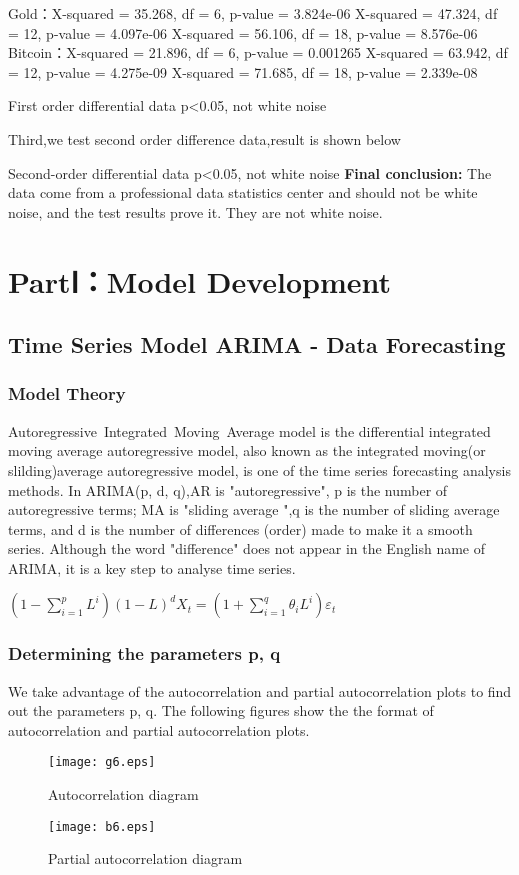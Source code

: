 \documentclass{mcmthesis}
\begin{document}
Gold：X-squared = 35.268, df = 6, p-value = 3.824e-06
X-squared = 47.324, df = 12, p-value = 4.097e-06
X-squared = 56.106, df = 18, p-value = 8.576e-06
Bitcoin：X-squared = 21.896, df = 6, p-value = 0.001265
X-squared = 63.942, df = 12, p-value = 4.275e-09
X-squared = 71.685, df = 18, p-value = 2.339e-08

First order differential data p<0.05, not white noise

Third,we test second order difference data,result is shown below

Second-order differential data p<0.05, not white noise
\textbf{Final conclusion: }
The data come from a professional data statistics center and should not be white noise, and the test results prove it. They are not white noise.


\section{PartⅠ：Model Development }
\subsection{Time Series Model ARIMA - Data Forecasting }
\subsubsection{Model Theory}
Autoregressive Integrated Moving Average model is the differential integrated moving average autoregressive model, 
also known as the integrated moving(or slilding)average autoregressive model, 
is one of the time series forecasting analysis methods. 
In ARIMA(p, d, q),AR is "autoregressive", p is the number of autoregressive terms;
MA is "sliding average ",q is the number of sliding average terms, and d is the number of differences (order) made to make it a smooth series.
Although the word "difference" does not appear in the English name of ARIMA, it is a key step to analyse time series.


$\left(1-\sum_{i=1}^{p} L^i \right)(1-L)^d X_t=\left(1+\sum_{i=1}^{q}\theta_i L^i \right)\varepsilon_t$


\subsubsection{Determining the parameters p, q }
We take advantage of the autocorrelation and partial autocorrelation plots to find out the parameters p, q.
The following figures show the the format of autocorrelation and partial autocorrelation plots.
\begin{figure}[!h]
  \centering 
  \texttt{[image: g6.eps]}
  \caption{Autocorrelation diagram}
  \texttt{[image: b6.eps]}
  \caption{Partial autocorrelation diagram} \label{fig6}
\end{figure}
\end{document}
